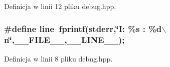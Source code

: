 Definicja w linii 12 pliku debug.hpp.\hypertarget{a00005_5bdec07ba0f5f220bcb40d5258725d95}{
\subsubsection[{line}]{\setlength{\rightskip}{0pt plus 5cm}\#define line~fprintf(stderr,\char`\"{}I: \%s : \%d$\backslash$n\char`\"{},\_\-\_\-FILE\_\-\_\-,\_\-\_\-LINE\_\-\_\-);}}
\label{a00005_5bdec07ba0f5f220bcb40d5258725d95}




Definicja w linii 8 pliku debug.hpp.